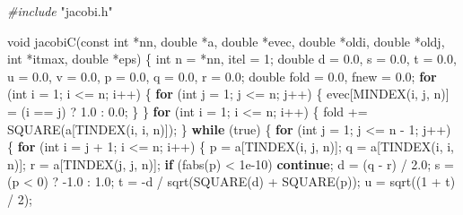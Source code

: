 \documentclass[12pt,]{article}
\newenvironment{Shaded}{\begin{snugshade}}{\end{snugshade}}
\newcommand{\DataTypeTok}[1]{\textcolor[rgb]{0.13,0.29,0.53}{#1}}
\newcommand{\DecValTok}[1]{\textcolor[rgb]{0.00,0.00,0.81}{#1}}
\newcommand{\FloatTok}[1]{\textcolor[rgb]{0.00,0.00,0.81}{#1}}
\newcommand{\ImportTok}[1]{#1}
\newcommand{\ControlFlowTok}[1]{\textcolor[rgb]{0.13,0.29,0.53}{\textbf{#1}}}
\newcommand{\PreprocessorTok}[1]{\textcolor[rgb]{0.56,0.35,0.01}{\textit{#1}}}
\newcommand{\NormalTok}[1]{#1}
\begin{document}
\begin{Shaded}
\begin{Highlighting}[]
\PreprocessorTok{#include }\ImportTok{"jacobi.h"}

\DataTypeTok{void}\NormalTok{ jacobiC(}\DataTypeTok{const} \DataTypeTok{int}\NormalTok{ *nn, }\DataTypeTok{double}\NormalTok{ *a, }\DataTypeTok{double}\NormalTok{ *evec, }\DataTypeTok{double}\NormalTok{ *oldi, }\DataTypeTok{double}\NormalTok{ *oldj,}
             \DataTypeTok{int}\NormalTok{ *itmax, }\DataTypeTok{double}\NormalTok{ *eps) \{}
    \DataTypeTok{int}\NormalTok{ n = *nn, itel = }\DecValTok{1}\NormalTok{;}
    \DataTypeTok{double}\NormalTok{ d = }\FloatTok{0.0}\NormalTok{, s = }\FloatTok{0.0}\NormalTok{, t = }\FloatTok{0.0}\NormalTok{, u = }\FloatTok{0.0}\NormalTok{, v = }\FloatTok{0.0}\NormalTok{, p = }\FloatTok{0.0}\NormalTok{, q = }\FloatTok{0.0}\NormalTok{,}
\NormalTok{           r = }\FloatTok{0.0}\NormalTok{;}
    \DataTypeTok{double}\NormalTok{ fold = }\FloatTok{0.0}\NormalTok{, fnew = }\FloatTok{0.0}\NormalTok{;}
    \ControlFlowTok{for}\NormalTok{ (}\DataTypeTok{int}\NormalTok{ i = }\DecValTok{1}\NormalTok{; i <= n; i++) \{}
        \ControlFlowTok{for}\NormalTok{ (}\DataTypeTok{int}\NormalTok{ j = }\DecValTok{1}\NormalTok{; j <= n; j++) \{}
\NormalTok{            evec[MINDEX(i, j, n)] = (i == j) ? }\FloatTok{1.0}\NormalTok{ : }\FloatTok{0.0}\NormalTok{;}
\NormalTok{        \}}
\NormalTok{    \}}
    \ControlFlowTok{for}\NormalTok{ (}\DataTypeTok{int}\NormalTok{ i = }\DecValTok{1}\NormalTok{; i <= n; i++) \{}
\NormalTok{        fold += SQUARE(a[TINDEX(i, i, n)]);}
\NormalTok{    \}}
    \ControlFlowTok{while}\NormalTok{ (true) \{}
        \ControlFlowTok{for}\NormalTok{ (}\DataTypeTok{int}\NormalTok{ j = }\DecValTok{1}\NormalTok{; j <= n - }\DecValTok{1}\NormalTok{; j++) \{}
            \ControlFlowTok{for}\NormalTok{ (}\DataTypeTok{int}\NormalTok{ i = j + }\DecValTok{1}\NormalTok{; i <= n; i++) \{}
\NormalTok{                p = a[TINDEX(i, j, n)];}
\NormalTok{                q = a[TINDEX(i, i, n)];}
\NormalTok{                r = a[TINDEX(j, j, n)];}
                \ControlFlowTok{if}\NormalTok{ (fabs(p) < }\FloatTok{1e-10}\NormalTok{) }\ControlFlowTok{continue}\NormalTok{;}
\NormalTok{                d = (q - r) / }\FloatTok{2.0}\NormalTok{;}
\NormalTok{                s = (p < }\DecValTok{0}\NormalTok{) ? -}\FloatTok{1.0}\NormalTok{ : }\FloatTok{1.0}\NormalTok{;}
\NormalTok{                t = -d / sqrt(SQUARE(d) + SQUARE(p));}
\NormalTok{                u = sqrt((}\DecValTok{1}\NormalTok{ + t) / }\DecValTok{2}\NormalTok{);}

\end{Highlighting}
\end{Shaded}
\end{document}
